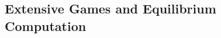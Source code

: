\documentclass[letterpaper]{article}
\begin{document}

\subsection{Extensive Games and Equilibrium Computation}
\end{document}
